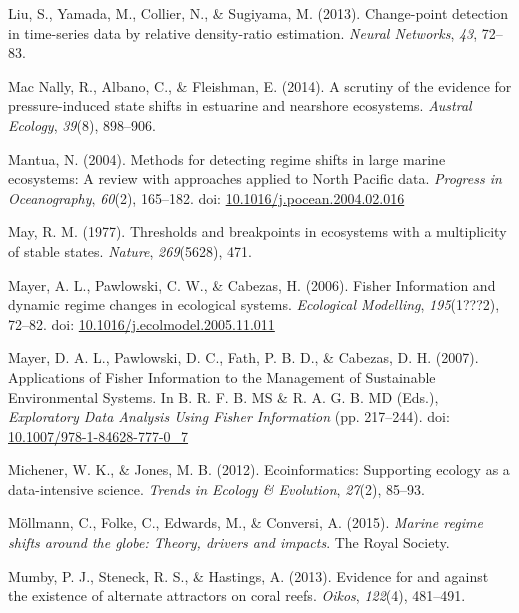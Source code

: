 \documentclass[12pt,twoside,openany]{reedthesis}
\begin{document}
\leavevmode\hypertarget{ref-liu2013change}{}%
Liu, S., Yamada, M., Collier, N., \& Sugiyama, M. (2013). Change-point detection in time-series data by relative density-ratio estimation. \emph{Neural Networks}, \emph{43}, 72--83.

\leavevmode\hypertarget{ref-mac2014scrutiny}{}%
Mac Nally, R., Albano, C., \& Fleishman, E. (2014). A scrutiny of the evidence for pressure-induced state shifts in estuarine and nearshore ecosystems. \emph{Austral Ecology}, \emph{39}(8), 898--906.

\leavevmode\hypertarget{ref-mantua_methods_2004}{}%
Mantua, N. (2004). Methods for detecting regime shifts in large marine ecosystems: A review with approaches applied to North Pacific data. \emph{Progress in Oceanography}, \emph{60}(2), 165--182. doi: \href{https://doi.org/10.1016/j.pocean.2004.02.016}{10.1016/j.pocean.2004.02.016}

\leavevmode\hypertarget{ref-may1977thresholds}{}%
May, R. M. (1977). Thresholds and breakpoints in ecosystems with a multiplicity of stable states. \emph{Nature}, \emph{269}(5628), 471.

\leavevmode\hypertarget{ref-mayer_fisher_2006}{}%
Mayer, A. L., Pawlowski, C. W., \& Cabezas, H. (2006). Fisher Information and dynamic regime changes in ecological systems. \emph{Ecological Modelling}, \emph{195}(1???2), 72--82. doi: \href{https://doi.org/10.1016/j.ecolmodel.2005.11.011}{10.1016/j.ecolmodel.2005.11.011}

\leavevmode\hypertarget{ref-mayer_applications_2007}{}%
Mayer, D. A. L., Pawlowski, D. C., Fath, P. B. D., \& Cabezas, D. H. (2007). Applications of Fisher Information to the Management of Sustainable Environmental Systems. In B. R. F. B. MS \& R. A. G. B. MD (Eds.), \emph{Exploratory Data Analysis Using Fisher Information} (pp. 217--244). doi: \href{https://doi.org/10.1007/978-1-84628-777-0_7}{10.1007/978-1-84628-777-0\_7}

\leavevmode\hypertarget{ref-michener2012ecoinformatics}{}%
Michener, W. K., \& Jones, M. B. (2012). Ecoinformatics: Supporting ecology as a data-intensive science. \emph{Trends in Ecology \& Evolution}, \emph{27}(2), 85--93.

\leavevmode\hypertarget{ref-mollmann2015marine}{}%
Möllmann, C., Folke, C., Edwards, M., \& Conversi, A. (2015). \emph{Marine regime shifts around the globe: Theory, drivers and impacts}. The Royal Society.

\leavevmode\hypertarget{ref-mumby2013evidence}{}%
Mumby, P. J., Steneck, R. S., \& Hastings, A. (2013). Evidence for and against the existence of alternate attractors on coral reefs. \emph{Oikos}, \emph{122}(4), 481--491.
\end{document}
